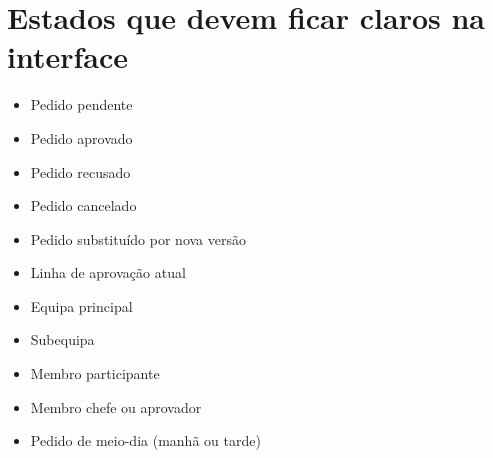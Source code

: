 \documentclass[11pt,a4paper]{article}
\begin{document}
\section{Estados que devem ficar claros na interface}
\begin{itemize}
  \item Pedido pendente
  \item Pedido aprovado
  \item Pedido recusado
  \item Pedido cancelado
  \item Pedido substituído por nova versão
  \item Linha de aprovação atual
  \item Equipa principal
  \item Subequipa
  \item Membro participante
  \item Membro chefe ou aprovador
  \item Pedido de meio-dia (manhã ou tarde)
\end{itemize}
\end{document}
